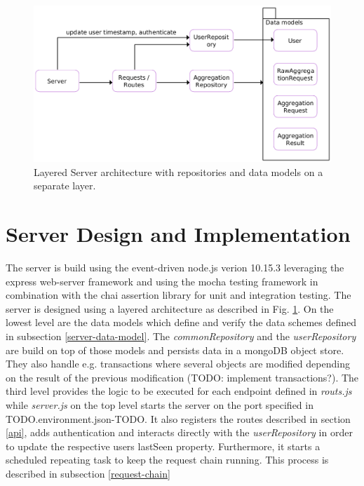 \begin{figure}[h!]
  \includegraphics[width=\textwidth]{data/diagrams/server-diagram.png}
  \caption{Layered Server architecture with repositories and data models on a separate layer.}
  \label{server-architecture}
\end{figure}

\section{Server Design and Implementation}\label{server}
The server is build using the event-driven node.js verion 10.15.3 leveraging the express web-server framework \parencite{express} and using the mocha testing framework \parencite{mocha} in combination with the chai assertion library \parencite{chai} for unit and integration testing. The server is designed using a layered architecture as described in Fig. \ref{server-architecture}. On the lowest level are the data models which define and verify the data schemes defined in subsection \ref{server-data-model}. The \textit{commonRepository} and the \textit{userRepository} are build on top of those models and persists data in a mongoDB object store. They also handle e.g. transactions where several objects are modified depending on the result of the previous modification (TODO: implement transactions?). The third level provides the logic to be executed for each endpoint defined in \textit{routs.js} while \textit{server.js} on the top level starts the server on the port specified in TODO.environment.json-TODO. It also registers the routes described in section \ref{api}, adds authentication and interacts directly with the \textit{userRepository} in order to update the respective users lastSeen property. Furthermore, it starts a scheduled repeating task to keep the request chain running. This process is described in subsection \ref{request-chain}


